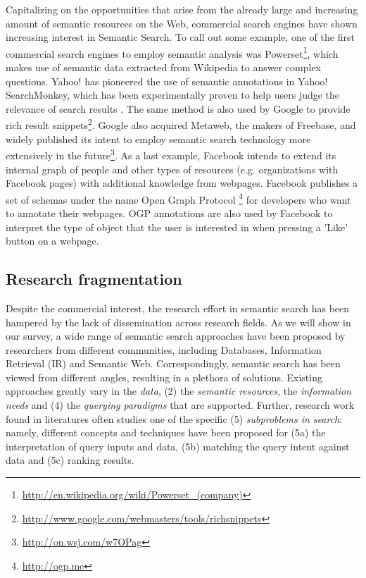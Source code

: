 Capitalizing on the opportunities that arise from the already large and increasing amount of semantic resources on the Web, commercial search engines have shown increasing interest in Semantic Search. To call out some example, one of the first commercial search engines to employ semantic analysis was Powerset\footnote{\url{http://en.wikipedia.org/wiki/Powerset_(company)}}, which makes use of semantic data extracted from Wikipedia to answer complex questions. Yahoo! has pioneered the use of semantic annotations in Yahoo! SearchMonkey, which has been experimentally proven to help users judge the relevance of search results \cite{DBLP:conf/sigir/HaasMTB11}. The same method is also used by Google to provide rich result snippets\footnote{\url{http://www.google.com/webmasters/tools/richsnippets}}. Google also acquired Metaweb, the makers of Freebase, and widely published its intent to employ semantic search technology more extensively in the future\footnote{\url{http://on.wsj.com/w7OPag}}. As a last example, Facebook intends to extend its internal graph of people and other types of resources (e.g. organizations with Facebook pages) with additional knowledge from webpages. Facebook publishes a set of schemas under the name Open Graph Protocol \footnote{\url{http://ogp.me}} for developers who want to annotate their webpages. OGP annotations are also used by Facebook to interpret the type of object that the user is interested in when pressing a 'Like' button on a webpage.

\subsection{Research fragmentation}

Despite the commercial interest, the research effort in semantic search has been hampered by the lack of dissemination across research fields. As we will show in our survey, a wide range of semantic search approaches have been proposed by researchers from different communities, including Databases, Information Retrieval (IR) and Semantic Web. Correspondingly, semantic search has been viewed from different angles, resulting in a plethora of solutions. Existing approaches greatly vary in the \emph{data}, (2) the \emph{semantic resources}, the \emph{information needs} and (4) the \emph{querying paradigms} that are supported. Further, research work found in literatures often studies one of the specific (5) \emph{subproblems in search}: namely, different concepts and techniques have been proposed for (5a) the interpretation of query inputs and data, (5b) matching the query intent against data and (5c) ranking results.  


